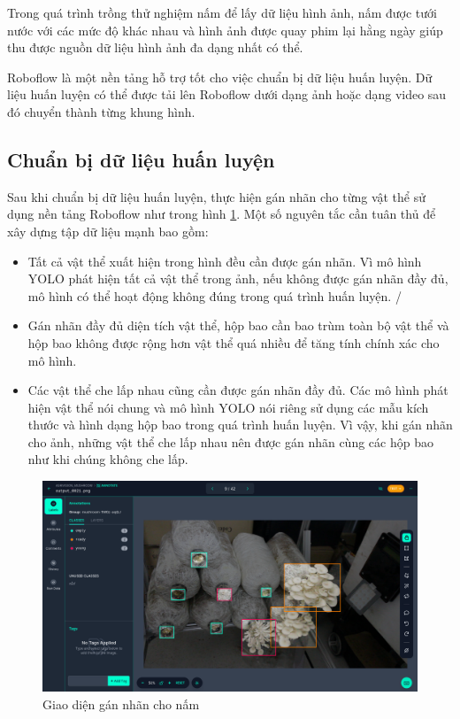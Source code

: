 Trong quá trình trồng thử nghiệm nấm để lấy dữ liệu hình ảnh, nấm được tưới nước với các mức độ khác nhau và hình ảnh được quay phim lại hằng ngày giúp thu được nguồn dữ liệu hình ảnh đa dạng nhất có thể.

Roboflow là một nền tảng hỗ trợ tốt cho việc chuẩn bị dữ liệu huấn luyện. Dữ liệu huấn luyện có thể được tải lên Roboflow dưới dạng ảnh hoặc dạng video sau đó chuyển thành từng khung hình.


\subsection{Chuẩn bị dữ liệu huấn luyện}

Sau khi chuẩn bị dữ liệu huấn luyện, thực hiện gán nhãn cho từng vật thể sử dụng nền tảng Roboflow như trong hình \ref{fig:labelling-interface}. Một số nguyên tắc cần tuân thủ để xây dựng tập dữ liệu mạnh bao gồm:
\begin{itemize}
	\item Tất cả vật thể xuất hiện trong hình đều cần được gán nhãn. Vì mô hình YOLO phát hiện tất cả vật thể trong ảnh, nếu không được gán nhãn đầy đủ, mô hình có thể hoạt động không đúng trong quá trình huấn luyện.
	/
	\item Gán nhãn đầy đủ diện tích vật thể, hộp bao cần bao trùm toàn bộ vật thể và hộp bao không được rộng hơn vật thể quá nhiều để tăng tính chính xác cho mô hình.
	
	\item Các vật thể che lấp nhau cũng cần được gán nhãn đầy đủ. Các mô hình phát hiện vật thể nói chung và mô hình YOLO nói riêng sử dụng các mẫu kích thước và hình dạng hộp bao trong quá trình huấn luyện. Vì vậy, khi gán nhãn cho ảnh, những vật thể che lấp nhau nên được gán nhãn cùng các hộp bao như khi chúng không che lấp.
\end{itemize}

\begin{figure}[H]
	\centering
	\includegraphics[width=0.7\linewidth]{images/labelling-interface}
	\caption{Giao diện gán nhãn cho nấm}
	\label{fig:labelling-interface}
\end{figure}

